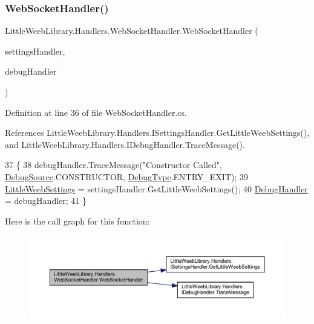 \subsubsection{\texorpdfstring{Web\+Socket\+Handler()}{WebSocketHandler()}}
{\footnotesize\ttfamily Little\+Weeb\+Library.\+Handlers.\+Web\+Socket\+Handler.\+Web\+Socket\+Handler (\begin{DoxyParamCaption}\item[{\mbox{\hyperlink{interface_little_weeb_library_1_1_handlers_1_1_i_settings_handler}{I\+Settings\+Handler}}}]{settings\+Handler,  }\item[{\mbox{\hyperlink{interface_little_weeb_library_1_1_handlers_1_1_i_debug_handler}{I\+Debug\+Handler}}}]{debug\+Handler }\end{DoxyParamCaption})}



Definition at line 36 of file Web\+Socket\+Handler.\+cs.



References Little\+Weeb\+Library.\+Handlers.\+I\+Settings\+Handler.\+Get\+Little\+Weeb\+Settings(), and Little\+Weeb\+Library.\+Handlers.\+I\+Debug\+Handler.\+Trace\+Message().


\begin{DoxyCode}
37         \{
38             debugHandler.TraceMessage(\textcolor{stringliteral}{"Constructor Called"}, \mbox{\hyperlink{namespace_little_weeb_library_1_1_handlers_a2a6ca0775121c9c503d58aa254d292be}{DebugSource}}.CONSTRUCTOR, 
      \mbox{\hyperlink{namespace_little_weeb_library_1_1_handlers_ab66019ed40462876ec4e61bb3ccb0a62}{DebugType}}.ENTRY\_EXIT);
39             \mbox{\hyperlink{class_little_weeb_library_1_1_settings_1_1_little_weeb_settings}{LittleWeebSettings}} = settingsHandler.GetLittleWeebSettings();
40             \mbox{\hyperlink{class_little_weeb_library_1_1_handlers_1_1_web_socket_handler_aa1474285fe938f284633c31403bf9edf}{DebugHandler}} = debugHandler;
41         \}
\end{DoxyCode}
Here is the call graph for this function\+:\nopagebreak
\begin{figure}[H]
\begin{center}
\leavevmode
\includegraphics[width=350pt]{class_little_weeb_library_1_1_handlers_1_1_web_socket_handler_aa420f7ed35d16df6ef6f18bd0ab8fa3a_cgraph}
\end{center}
\end{figure}


